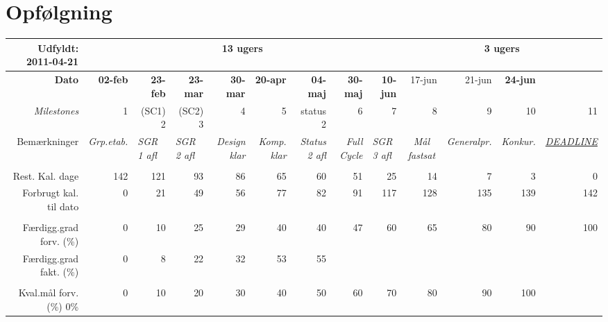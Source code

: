 \section{Opfølgning}

\begin{sidewaystable}[!htbp]
\begin{scriptsize}
    \begin{tabular}{r|rrrrrrrr|rrrr}
Udfyldt: 2011-04-21    & \multicolumn{8}{c|}{13 ugers} & \multicolumn{4}{c}{3 ugers} \\ \hline
    \textbf{Dato} & \textbf{02-feb} & \textbf{23-feb} & \textbf{23-mar} & \textbf{30-mar} & \textbf{20-apr} & \textbf{04-maj} & \textbf{30-maj} & \textbf{10-jun} & 17-jun & 21-jun & \textbf{24-jun} \\
    \textit{Milestones} & 1     & (SC1) 2 & (SC2) 3 & 4     & 5     & status 2 & 6     & 7     & 8     & 9     & 10    & 11 \\
    Bemærkninger & \textit{Grp.etab.} & \multicolumn{1}{l}{\textit{SGR 1 afl}} & \multicolumn{1}{l}{\textit{SGR 2 afl}} & \textit{Design klar} & \textit{Komp. klar} & \textit{Status 2 afl} & \textit{Full Cycle} & \multicolumn{1}{l|}{\textit{SGR 3 afl}} & \multicolumn{1}{c}{\textit{Mål fastsat}} & \multicolumn{1}{c}{\textit{Generalpr.}} & \multicolumn{1}{c}{\textit{Konkur.}} & \multicolumn{1}{c}{\textit{\underline{DEADLINE}}} \\
          &       &       &       &       &       &       &       & & & & &  \\
    Rest. Kal. dage & 142   & 121   & 93    & 86    & 65    & 60    & 51    & 25    & 14    & 7     & 3     & 0 \\
    Forbrugt kal. til dato & 0     & 21    & 49    & 56    & 77    & 82    & 91    & 117   & 128   & 135   & 139   & 142 \\
          &       &       &       &       &       &       &       &       &       &       &  \\
    Færdigg.grad forv. (\%) & 0     & 10    & 25    & 29    & 40    & 40    & 47    & 60    & 65    & 80    & 90   & 100  \\
    Færdigg.grad fakt. (\%) & 0     & 8     & 22    & 32    & 53    & 55    &       &       &       &       &   \\
          &       &       &       &       &       &       &       &       &       &       &  \\
    Kval.mål forv. (\%) 0\% & 0     & 10    & 20    & 30    & 40    & 50    & 60    & 70    & 80    & 90    & 100 \\

\end{tabular}
\end{scriptsize}
\end{sidewaystable}
